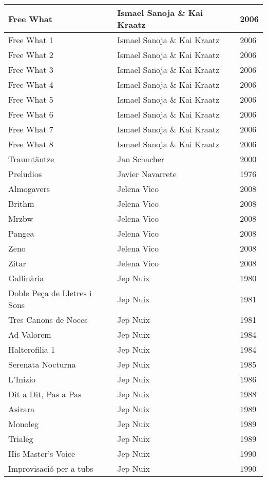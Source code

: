 \begin{center}
\begin{longtable}{| p{} | p{} | p{} |}
Free What & Ismael Sanoja \& Kai Kraatz & 2006 \\ \hline 
Free What 1 & Ismael Sanoja \& Kai Kraatz & 2006 \\ \hline 
Free What 2 & Ismael Sanoja \& Kai Kraatz & 2006 \\ \hline 
Free What 3 & Ismael Sanoja \& Kai Kraatz & 2006 \\ \hline 
Free What 4 & Ismael Sanoja \& Kai Kraatz & 2006 \\ \hline 
Free What 5 & Ismael Sanoja \& Kai Kraatz & 2006 \\ \hline 
Free What 6 & Ismael Sanoja \& Kai Kraatz & 2006 \\ \hline 
Free What 7 & Ismael Sanoja \& Kai Kraatz & 2006 \\ \hline 
Free What 8 & Ismael Sanoja \& Kai Kraatz & 2006 \\ \hline 
Traumtäntze & Jan Schacher & 2000 \\ \hline 
Preludios & Javier Navarrete & 1976 \\ \hline 
Almogavers & Jelena Vico & 2008 \\ \hline 
Brithm & Jelena Vico & 2008 \\ \hline 
Mrzbw & Jelena Vico & 2008 \\ \hline 
Pangea & Jelena Vico & 2008 \\ \hline 
Zeno & Jelena Vico & 2008 \\ \hline 
Zitar & Jelena Vico & 2008 \\ \hline 
Gallinària & Jep Nuix & 1980 \\ \hline 
Doble Peça de Lletres i Sons & Jep Nuix & 1981 \\ \hline 
Tres Canons de Noces & Jep Nuix & 1981 \\ \hline 
Ad Valorem & Jep Nuix & 1984 \\ \hline 
Halterofilia 1 & Jep Nuix & 1984 \\ \hline 
Serenata Nocturna & Jep Nuix & 1985 \\ \hline 
L'Inizio & Jep Nuix & 1986 \\ \hline 
Dit a Dit, Pas a Pas & Jep Nuix & 1988 \\ \hline 
Asirara & Jep Nuix & 1989 \\ \hline 
Monoleg & Jep Nuix & 1989 \\ \hline 
Trialeg & Jep Nuix & 1989 \\ \hline 
His Master's Voice & Jep Nuix & 1990 \\ \hline 
Improvisació per a tubs & Jep Nuix & 1990 \\ \hline 

\end{longtable}
\end{center}
